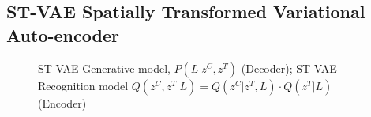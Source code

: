 \subsection{{\bf ST-VAE} Spatially Transformed Variational Auto-encoder}\label{sec:stvae}\vspace{-3mm}
\begin{figure}[t]
\begin{center}
\qquad\qquad
{}\vspace{-4mm}
\end{center}
 \caption{\footnotesize
  ST-VAE Generative model, $P(L | z^C, z^T)$ (Decoder);  ST-VAE Recognition model $Q(z^C,z^T | L) = Q(z^C | z^T, L)\cdot Q(z^T | L)$ (Encoder)   
  }\vspace{-5mm}
\label{fig:stvaemodel}
\end{figure}


